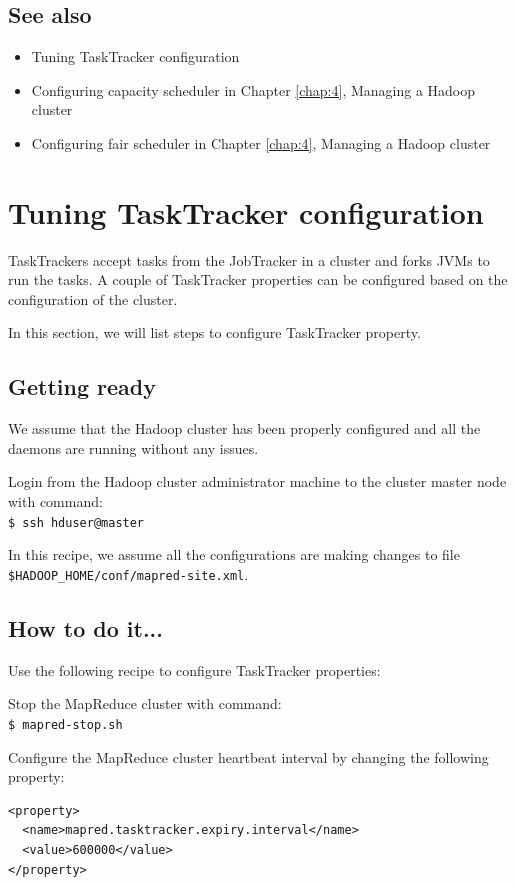 \subsection*{See also}
\begin{itemize}
  \item Tuning TaskTracker configuration
  \item Configuring capacity scheduler in Chapter \ref{chap:4}, Managing a Hadoop cluster
  \item Configuring fair scheduler in Chapter \ref{chap:4}, Managing a Hadoop cluster
\end{itemize}
\section{Tuning TaskTracker configuration}
TaskTrackers accept tasks from the JobTracker in a cluster and forks JVMs to run the tasks. A couple of TaskTracker properties can be configured based on the configuration of the cluster.

In this section, we will list steps to configure TaskTracker property.
\subsection*{Getting ready}
We assume that the Hadoop cluster has been properly configured and all the daemons are running without any issues.

Login from the Hadoop cluster administrator machine to the cluster master node with command: \\
\verb|$ ssh hduser@master|

In this recipe, we assume all the configurations are making changes to file \verb|$HADOOP_HOME/conf/mapred-site.xml|.
\subsection*{How to do it...}
Use the following recipe to configure TaskTracker properties:

Stop the MapReduce cluster with command: \\
\verb|$ mapred-stop.sh|

Configure the MapReduce cluster heartbeat interval by changing the following property:
\lstset{style=bashstyle}
\begin{lstlisting}
<property>
  <name>mapred.tasktracker.expiry.interval</name>
  <value>600000</value>
</property>
\end{lstlisting}

